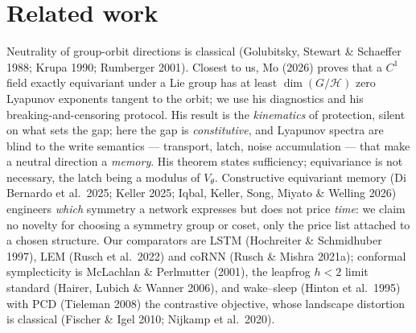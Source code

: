 \documentclass{article}
\begin{document}
\section{Related work}\label{sec:related}

Neutrality of group-orbit directions is classical (Golubitsky, Stewart \& Schaeffer 1988; Krupa 1990; Rumberger 2001). Closest to us, Mo (2026) proves that a $C^1$ field exactly equivariant under a Lie group has at least $\dim(G/\mathcal H)$ zero Lyapunov exponents tangent to the orbit; we use his diagnostics and his breaking-and-censoring protocol. His result is the \emph{kinematics} of protection, silent on what sets the gap; here the gap is \emph{constitutive}, and Lyapunov spectra are blind to the write semantics --- transport, latch, noise accumulation --- that make a neutral direction a \emph{memory}. His theorem states sufficiency; equivariance is not necessary, the latch being a modulus of $V_\theta$. Constructive equivariant memory (Di Bernardo et al.\ 2025; Keller 2025; Iqbal, Keller, Song, Miyato \& Welling 2026) engineers \emph{which} symmetry a network expresses but does not price \emph{time}: we claim no novelty for choosing a symmetry group or coset, only the price list attached to a chosen structure. Our comparators are LSTM (Hochreiter \& Schmidhuber 1997), LEM (Rusch et al.\ 2022) and coRNN (Rusch \& Mishra 2021a); conformal symplecticity is McLachlan \& Perlmutter (2001), the leapfrog $h<2$ limit standard (Hairer, Lubich \& Wanner 2006), and wake--sleep (Hinton et al.\ 1995) with PCD (Tieleman 2008) the contrastive objective, whose landscape distortion is classical (Fischer \& Igel 2010; Nijkamp et al.\ 2020).
\end{document}
